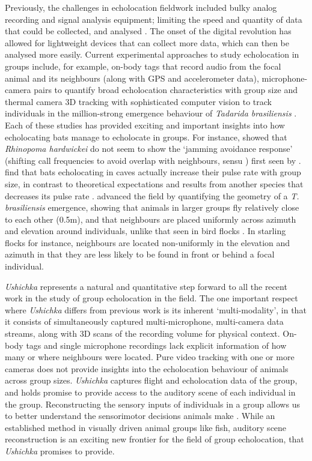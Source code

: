 \documentclass[
]{book}
\begin{document}
Previously, the challenges in echolocation fieldwork included bulky analog recording and signal analysis equipment; limiting the speed and quantity of data that could be collected, and analysed \citep{Griffin1958, habersetzer1981a}. The onset of the digital revolution has allowed for lightweight devices that can collect more data, which can then be analysed more easily. Current experimental approaches to study echolocation in groups include, for example, on-body tags that record audio from the focal animal and its neighbours (along with GPS and accelerometer data)\citep{cvikel2015b}, microphone-camera pairs to quantify broad echolocation characteristics with group size \citep{lin2016bats} and thermal camera 3D tracking with sophisticated computer vision to track individuals in the million-strong emergence behaviour of \emph{Tadarida brasiliensis} \citep{betke2007tracking, theriault2010a}. Each of these studies has provided exciting and important insights into how echolocating bats manage to echolocate in groups. For instance, \citet{cvikel2015b} showed that \emph{Rhinopoma hardwickei} do not seem to show the `jamming avoidance response' (shifting call frequencies to avoid overlap with neighbours, sensu \citet{ulanovsky2004dynamics}) first seen by \citet{habersetzer1981a}. \citet{lin2016bats} find that bats echolocating in caves actually increase their pulse rate with group size, in contrast to theoretical expectations and results from another species that decreases its pulse rate \citep{jarvis2013groups}. \citet{theriault2010a} advanced the field by quantifying the geometry of a \emph{T. brasiliensis} emergence, showing that animals in larger groups fly relatively close to each other (0.5m), and that neighbours are placed uniformly across azimuth and elevation around individuals, unlike that seen in bird flocks \citep{ballerini2008a}. In starling flocks for instance, neighbours are located non-uniformly in the elevation and azimuth in that they are less likely to be found in front or behind a focal individual.

\emph{Ushichka} represents a natural and quantitative step forward to all the recent work in the study of group echolocation in the field. The one important respect where \emph{Ushichka} differs from previous work is its inherent `multi-modality', in that it consists of simultaneously captured multi-microphone, multi-camera data streams, along with 3D scans of the recording volume for physical context. On-body tags and single microphone recordings lack explicit information of how many or where neighbours were located. Pure video tracking with one or more cameras does not provide insights into the echolocation behaviour of animals across group sizes. \emph{Ushichka} captures flight and echolocation data of the group, and holds promise to provide access to the auditory scene \citep{Moss2001} of each individual in the group. Reconstructing the sensory inputs of individuals in a group allows us to better understand the sensorimotor decisions animals make \citep{strandburg2013visual}. While an established method in visually driven animal groups like fish, auditory scene reconstruction is an exciting new frontier for the field of group echolocation, that \emph{Ushichka} promises to provide.
\end{document}
